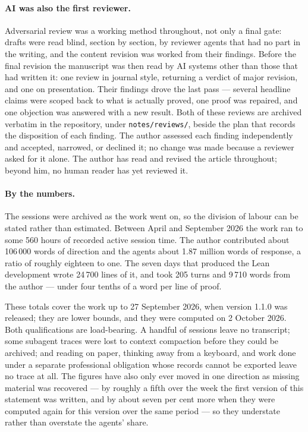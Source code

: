 \paragraph{AI was also the first reviewer.} Adversarial review was a working method
throughout, not only a final gate: drafts were read blind, section by section, by reviewer
agents that had no part in the writing, and the content revision was worked from their
findings. Before the final revision the manuscript was then read by AI systems other than
those that had written it: one review in journal style, returning a verdict of major
revision, and one on presentation. Their findings drove the last pass --- several headline
claims were scoped back to what is actually proved, one proof was repaired, and one
objection was answered with a new result. Both of these reviews are archived verbatim in
the repository, under \texttt{notes/reviews/}, beside the plan that records the disposition
of each finding. The author assessed each finding independently and accepted, narrowed, or
declined it; no change was made because a reviewer asked for it alone. The author has read
and revised the article throughout; beyond him, no human reader has yet reviewed it.

\paragraph{By the numbers.} The sessions were archived as the work went on, so the division of
labour can be stated rather than estimated. Between April and September 2026 the work ran to
some 560 hours of recorded active session time. The author contributed about 106\,000 words of
direction and the agents about 1.87 million words of response, a ratio of roughly eighteen to
one. The seven days that produced the Lean development wrote 24\,700 lines of it, and took 205
turns and 9\,710 words from the author --- under four tenths of a word per line of proof.

These totals cover the work up to 27 September 2026, when version 1.1.0 was released; they are
lower bounds, and they were computed on 2 October 2026. Both qualifications are load-bearing. A handful of sessions leave no transcript; some subagent traces were lost to
context compaction before they could be archived; and reading on paper, thinking away from a
keyboard, and work done under a separate professional obligation whose records cannot be
exported leave no trace at all. The figures have also only ever moved in one direction as
missing material was recovered --- by roughly a fifth over the week the first version of this
statement was written, and by about seven per cent more when they were computed again for this
version over the same period --- so they understate rather than overstate the agents' share.

